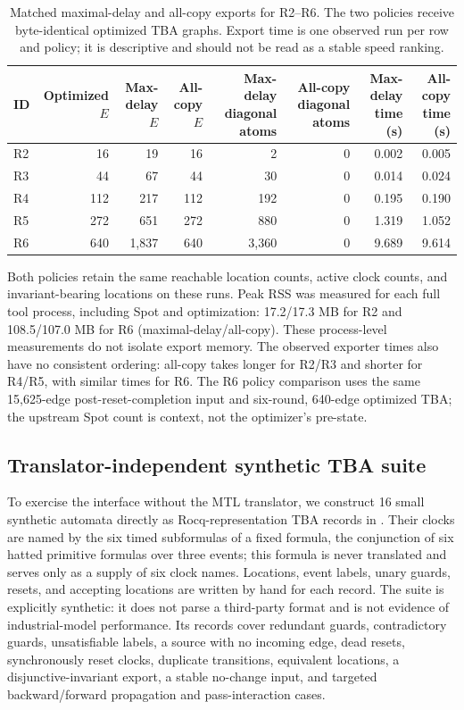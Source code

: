 \begin{table}[t]
\centering
\caption{Matched maximal-delay and all-copy exports for R2--R6. The two
policies receive byte-identical optimized TBA graphs. Export time is one
observed run per row and policy; it is descriptive and should not be read as
a stable speed ranking.}
\label{tab:generated-export-policy}
\scriptsize
\setlength{\tabcolsep}{4pt}
\begin{tabular}{@{}lrrrrrrr@{}}
\toprule
ID & Optimized $E$ & Max-delay $E$ & All-copy $E$ & Max-delay diagonal atoms & All-copy diagonal atoms & Max-delay time (s) & All-copy time (s)\\
\midrule
R2 & 16 & 19 & 16 & 2 & 0 & 0.002 & 0.005\\
R3 & 44 & 67 & 44 & 30 & 0 & 0.014 & 0.024\\
R4 & 112 & 217 & 112 & 192 & 0 & 0.195 & 0.190\\
R5 & 272 & 651 & 272 & 880 & 0 & 1.319 & 1.052\\
R6 & 640 & 1,837 & 640 & 3,360 & 0 & 9.689 & 9.614\\
\bottomrule
\end{tabular}
\end{table}

Both policies retain the same reachable location counts, active clock counts,
and invariant-bearing locations on these runs. Peak RSS was measured for
each full tool process, including Spot and optimization: 17.2/17.3 MB for R2
and 108.5/107.0 MB for R6 (maximal-delay/all-copy). These process-level
measurements do not isolate export memory. The observed exporter times also
have no consistent ordering: all-copy takes longer for R2/R3 and shorter for
R4/R5, with similar times for R6. The R6 policy comparison uses the same
15,625-edge post-reset-completion input and six-round, 640-edge optimized
TBA; the upstream Spot count is context, not the optimizer's pre-state.

\subsection{Translator-independent synthetic TBA suite}
To exercise the interface without the MTL translator, we construct
16 small synthetic automata directly as Rocq-representation TBA records in
. Their clocks are named by the six
timed subformulas of a fixed formula, the conjunction of six hatted primitive
formulas over three events; this formula is never translated and serves only
as a supply of six clock names. Locations, event labels, unary guards,
resets, and accepting locations are written by hand for each record. The suite is explicitly
synthetic: it does not parse a third-party format and is not evidence of
industrial-model performance. Its records cover redundant guards,
contradictory guards, unsatisfiable labels, a source with no incoming edge,
dead resets, synchronously reset clocks, duplicate transitions, equivalent
locations, a disjunctive-invariant export, a stable no-change input, and
targeted backward/forward propagation and pass-interaction cases.


